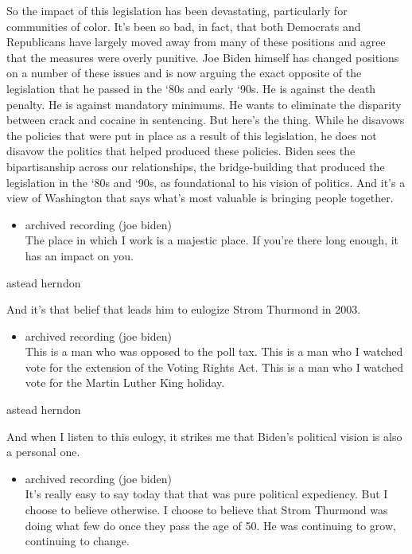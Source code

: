 So the impact of this legislation has been devastating, particularly for
communities of color. It's been so bad, in fact, that both Democrats and
Republicans have largely moved away from many of these positions and
agree that the measures were overly punitive. Joe Biden himself has
changed positions on a number of these issues and is now arguing the
exact opposite of the legislation that he passed in the `80s and early
`90s. He is against the death penalty. He is against mandatory minimums.
He wants to eliminate the disparity between crack and cocaine in
sentencing. But here's the thing. While he disavows the policies that
were put in place as a result of this legislation, he does not disavow
the politics that helped produced these policies. Biden sees the
bipartisanship across our relationships, the bridge-building that
produced the legislation in the `80s and `90s, as foundational to his
vision of politics. And it's a view of Washington that says what's most
valuable is bringing people together.

\begin{itemize}
\tightlist
\item
  archived recording (joe biden)\\
  The place in which I work is a majestic place. If you're there long
  enough, it has an impact on you.
\end{itemize}

astead herndon

And it's that belief that leads him to eulogize Strom Thurmond in 2003.

\begin{itemize}
\tightlist
\item
  archived recording (joe biden)\\
  This is a man who was opposed to the poll tax. This is a man who I
  watched vote for the extension of the Voting Rights Act. This is a man
  who I watched vote for the Martin Luther King holiday.
\end{itemize}

astead herndon

And when I listen to this eulogy, it strikes me that Biden's political
vision is also a personal one.

\begin{itemize}
\tightlist
\item
  archived recording (joe biden)\\
  It's really easy to say today that that was pure political expediency.
  But I choose to believe otherwise. I choose to believe that Strom
  Thurmond was doing what few do once they pass the age of 50. He was
  continuing to grow, continuing to change.
\end{itemize}


